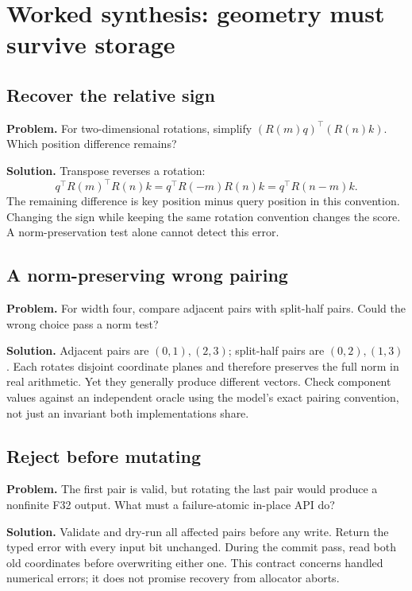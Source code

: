 \section{Worked synthesis: geometry must survive storage}
\subsection{Recover the relative sign}
\textbf{Problem.} For two-dimensional rotations, simplify
$(R(m)q)^\top(R(n)k)$. Which position difference remains?

\textbf{Solution.} Transpose reverses a rotation:
\begin{equation}
q^\top R(m)^\top R(n)k
=q^\top R(-m)R(n)k
=q^\top R(n-m)k.
\end{equation}
The remaining difference is key position minus query position in this
convention. Changing the sign while keeping the same rotation convention
changes the score. A norm-preservation test alone cannot detect this error.

\subsection{A norm-preserving wrong pairing}
\textbf{Problem.} For width four, compare adjacent pairs with split-half pairs.
Could the wrong choice pass a norm test?

\textbf{Solution.} Adjacent pairs are $(0,1),(2,3)$; split-half pairs are
$(0,2),(1,3)$. Each rotates disjoint coordinate planes and therefore preserves
the full norm in real arithmetic. Yet they generally produce different vectors.
Check component values against an independent oracle using the model's exact
pairing convention, not just an invariant both implementations share.

\subsection{Reject before mutating}
\textbf{Problem.} The first pair is valid, but rotating the last pair would
produce a nonfinite F32 output. What must a failure-atomic in-place API do?

\textbf{Solution.} Validate and dry-run all affected pairs before any write.
Return the typed error with every input bit unchanged. During the commit pass,
read both old coordinates before overwriting either one. This contract concerns
handled numerical errors; it does not promise recovery from allocator aborts.
